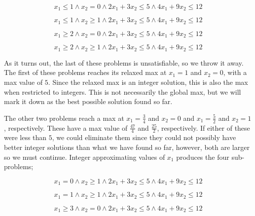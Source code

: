 \begin{equation}
    x_1 \leq 1 \wedge x_2 = 0 \wedge 2x_1 + 3x_2 \leq 5 \wedge 4x_1 + 9x_2 \leq 12
\end{equation}

\begin{equation}
    x_1 \leq 1 \wedge x_2 \geq 1 \wedge 2x_1 + 3x_2 \leq 5 \wedge 4x_1 + 9x_2 \leq 12
\end{equation}

\begin{equation}
    x_1 \geq 2 \wedge x_2 = 0 \wedge 2x_1 + 3x_2 \leq 5 \wedge 4x_1 + 9x_2 \leq 12
\end{equation}

\begin{equation}
    x_1 \geq 2 \wedge x_2 \geq 1 \wedge 2x_1 + 3x_2 \leq 5 \wedge 4x_1 + 9x_2 \leq 12
\end{equation}

As it turns out, the last of these problems is unsatisfiable, so we throw it away. The first of these problems reaches its relaxed max at $x_1 = 1$ and $x_2 = 0$, with a max value of $5$. Since the relaxed max is an integer solution, this is also the max when restricted to integers. This is not necessarily the global max, but we will mark it down as the best possible solution found so far.

The other two problems reach a max at $x_1 = \frac{3}{4}$ and $x_2 = 0$ and $x_1 = \frac{5}{2}$ and $x_2 = 1$, respectively. These have a max value of $\frac{47}{4}$ and $\frac{25}{2}$, respectively. If either of these were less than $5$, we could eliminate them since they could not possibly have better integer solutions than what we have found so far, however, both are larger so we must continue. Integer approximating values of $x_1$ produces the four sub-problems;

\begin{equation}
    x_1 = 0 \wedge x_2 \geq 1 \wedge 2x_1 + 3x_2 \leq 5 \wedge 4x_1 + 9x_2 \leq 12
\end{equation}

\begin{equation}
    x_1 = 1 \wedge x_2 \geq 1 \wedge 2x_1 + 3x_2 \leq 5 \wedge 4x_1 + 9x_2 \leq 12
\end{equation}

\begin{equation}
    x_1 \geq 3 \wedge x_2 = 0 \wedge 2x_1 + 3x_2 \leq 5 \wedge 4x_1 + 9x_2 \leq 12
\end{equation}

